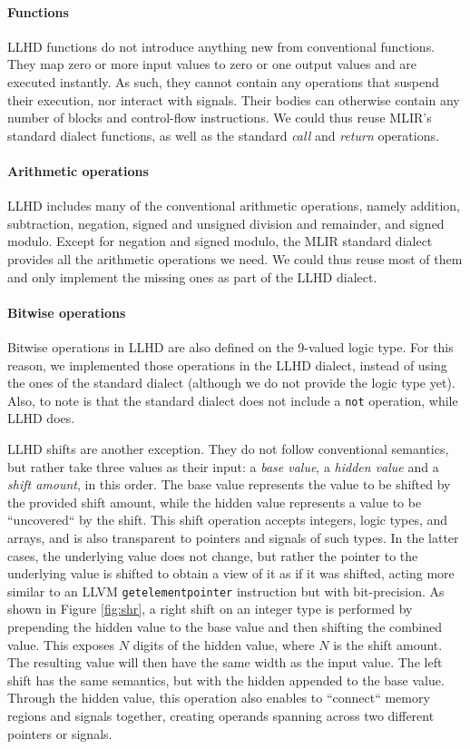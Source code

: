 \paragraph{Functions}
LLHD functions do not introduce anything new from conventional functions. They map zero or more input values to zero or one output values and are executed instantly. As such, they cannot contain any operations that suspend their execution, nor interact with signals. Their bodies can otherwise contain any number of blocks and control-flow instructions. We could thus reuse MLIR's standard dialect functions, as well as the standard \textit{call} and \textit{return} operations.

\paragraph{Arithmetic operations}
LLHD includes many of the conventional arithmetic operations, namely addition, subtraction, negation, signed and unsigned division and remainder, and signed modulo. Except for negation and signed modulo, the MLIR standard dialect provides all the arithmetic operations we need. We could thus reuse most of them and only implement the missing ones as part of the LLHD dialect.

\paragraph{Bitwise operations}
Bitwise operations in LLHD are also defined on the 9-valued logic type. For this reason, we implemented those operations in the LLHD dialect, instead of using the ones of the standard dialect (although we do not provide the logic type yet). Also, to note is that the standard dialect does not include a \texttt{not} operation, while LLHD does.

LLHD shifts are another exception. They do not follow conventional semantics, but rather take three values as their input: a \textit{base value}, a \textit{hidden value} and a \textit{shift amount}, in this order. The base value represents the value to be shifted by the provided shift amount, while the hidden value represents a value to be “uncovered“ by the shift. This shift operation accepts integers, logic types, and arrays, and is also transparent to pointers and signals of such types. In the latter cases, the underlying value does not change, but rather the pointer to the underlying value is shifted to obtain a view of it as if it was shifted, acting more similar to an LLVM \texttt{getelementpointer} instruction but with bit-precision. As shown in Figure \ref{fig:shr}, a right shift on an integer type is performed by prepending the hidden value to the base value and then shifting the combined value. This exposes $N$ digits of the hidden value, where $N$ is the shift amount. The resulting value will then have the same width as the input value. The left shift has the same semantics, but with the hidden appended to the base value.
Through the hidden value, this operation also enables to “connect“ memory regions and signals together, creating operands spanning across two different pointers or signals.

